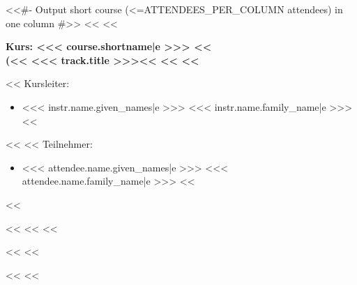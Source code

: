             <<#- Output short course (<=ATTENDEES_PER_COLUMN attendees) in one column #>>
            <<%
                <<%
                \begin{minipage}[t]{0.5\textwidth}
                    {\headingfamily\bfseries
                        Kurs: <<< course.shortname|e >>>
                        <<%
                            \\\mdseries
                            (<<%
                                <<< track.title >>><<%
                             <<%
                        <<%
                        \vspace{0.6\baselineskip}
                    }

                    <<%
                        Kursleiter:
                        \begin{itemize}
                            <<%
                                \item <<< instr.name.given_names|e >>> <<< instr.name.family_name|e >>>
                            <<%
                        \end{itemize}
                    <<%
                    <<%
                        Teilnehmer:
                        \begin{itemize}
                        <<%
                            \item <<< attendee.name.given_names|e >>> <<< attendee.name.family_name|e >>>
                        <<%
                        \end{itemize}
                    <<%
                \end{minipage}%
            <<%
            <<%
                <<%


                \pagebreak
            <<%
        <<%


        \pagebreak
    <<%
<<%
